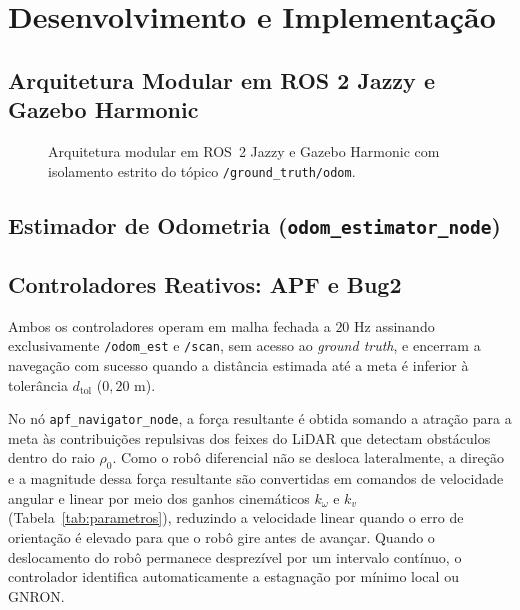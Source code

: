 \section{Desenvolvimento e Implementação}

\subsection{Arquitetura Modular em ROS 2 Jazzy e Gazebo Harmonic}

\begin{figure}[htbp]
\centering
\resizebox{\columnwidth}{!}{}
\caption{Arquitetura modular em ROS~2 Jazzy e Gazebo Harmonic com isolamento estrito do tópico \texttt{/ground\_truth/odom}.}
\label{fig:arquitetura_ros2}
\end{figure}

\subsection{Estimador de Odometria (\texttt{odom\_estimator\_node})}

\subsection{Controladores Reativos: APF e Bug2}

Ambos os controladores operam em malha fechada a $20\text{ Hz}$ assinando exclusivamente \texttt{/odom\_est} e \texttt{/scan}, sem acesso ao \textit{ground truth}, e encerram a navegação com sucesso quando a distância estimada até a meta é inferior à tolerância $d_{\text{tol}}$ ($0{,}20\text{ m}$).

No nó \texttt{apf\_navigator\_node}, a força resultante é obtida somando a atração para a meta às contribuições repulsivas dos feixes do LiDAR que detectam obstáculos dentro do raio $\rho_0$. Como o robô diferencial não se desloca lateralmente, a direção e a magnitude dessa força resultante são convertidas em comandos de velocidade angular e linear por meio dos ganhos cinemáticos $k_\omega$ e $k_v$ (Tabela~\ref{tab:parametros}), reduzindo a velocidade linear quando o erro de orientação é elevado para que o robô gire antes de avançar. Quando o deslocamento do robô permanece desprezível por um intervalo contínuo, o controlador identifica automaticamente a estagnação por mínimo local ou GNRON.

